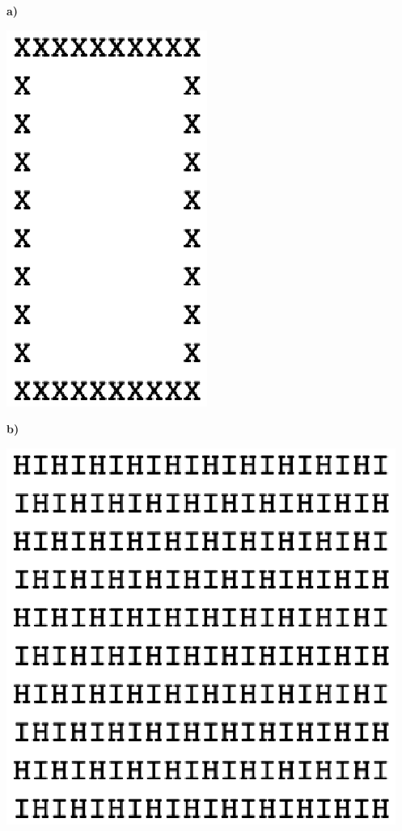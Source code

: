 \documentclass[11pt,a4paper]{article}
\begin{document}
\begin{enumerate}
\begin{minipage}{6cm}
\textbf{a)}
\begin{center}
\includegraphics[scale=0.5]{img/carreX2.eps}
\end{center}
\end{minipage}
\begin{minipage}{6cm}
\textbf{b)}
\begin{center}
\includegraphics[scale=0.5]{img/carreX4.eps}

\end{center}
\end{minipage}
\end{enumerate}
\end{document}
